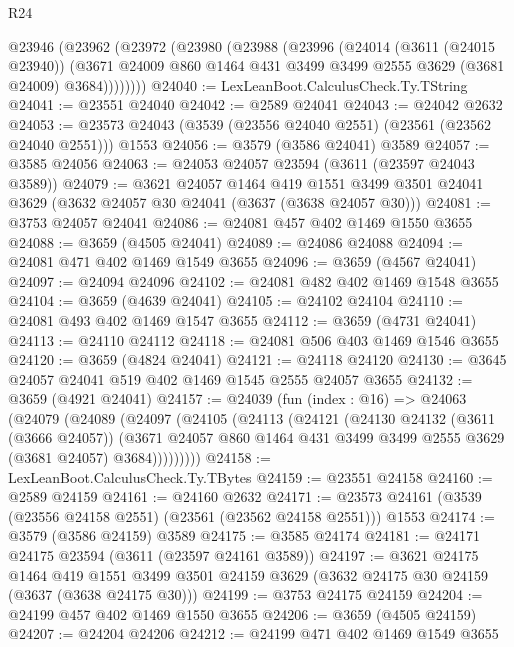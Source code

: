 \begin{lexlean}{R24}
\begin{coremodule}
    @23946
      (@23962
        (@23972
          (@23980
            (@23988
              (@23996
                (@24014
                  (@3611 (@24015 @23940))
                  (@3671 @24009 @860 @1464 @431 @3499 @3499 @2555 @3629 (@3681 @24009) @3684))))))))
@24040 := LexLeanBoot.CalculusCheck.Ty.TString
@24041 := @23551 @24040
@24042 := @2589 @24041
@24043 := @24042 @2632
@24053 := @23573 @24043 (@3539 (@23556 @24040 @2551) (@23561 (@23562 @24040 @2551))) @1553
@24056 := @3579 (@3586 @24041) @3589
@24057 := @3585 @24056
@24063 := @24053 @24057 @23594 (@3611 (@23597 @24043 @3589))
@24079 := @3621
    @24057
    @1464
    @419
    @1551
    @3499
    @3501
    @24041
    @3629
    (@3632 @24057 @30 @24041 (@3637 (@3638 @24057 @30)))
@24081 := @3753 @24057 @24041
@24086 := @24081 @457 @402 @1469 @1550 @3655
@24088 := @3659 (@4505 @24041)
@24089 := @24086 @24088
@24094 := @24081 @471 @402 @1469 @1549 @3655
@24096 := @3659 (@4567 @24041)
@24097 := @24094 @24096
@24102 := @24081 @482 @402 @1469 @1548 @3655
@24104 := @3659 (@4639 @24041)
@24105 := @24102 @24104
@24110 := @24081 @493 @402 @1469 @1547 @3655
@24112 := @3659 (@4731 @24041)
@24113 := @24110 @24112
@24118 := @24081 @506 @403 @1469 @1546 @3655
@24120 := @3659 (@4824 @24041)
@24121 := @24118 @24120
@24130 := @3645 @24057 @24041 @519 @402 @1469 @1545 @2555 @24057 @3655
@24132 := @3659 (@4921 @24041)
@24157 := @24039
    (fun (index : @16) =>
    @24063
      (@24079
        (@24089
          (@24097
            (@24105
              (@24113
                (@24121
                  (@24130
                    @24132
                    (@3611 (@3666 @24057))
                    (@3671
                      @24057
                      @860
                      @1464
                      @431
                      @3499
                      @3499
                      @2555
                      @3629
                      (@3681 @24057)
                      @3684)))))))))
@24158 := LexLeanBoot.CalculusCheck.Ty.TBytes
@24159 := @23551 @24158
@24160 := @2589 @24159
@24161 := @24160 @2632
@24171 := @23573 @24161 (@3539 (@23556 @24158 @2551) (@23561 (@23562 @24158 @2551))) @1553
@24174 := @3579 (@3586 @24159) @3589
@24175 := @3585 @24174
@24181 := @24171 @24175 @23594 (@3611 (@23597 @24161 @3589))
@24197 := @3621
    @24175
    @1464
    @419
    @1551
    @3499
    @3501
    @24159
    @3629
    (@3632 @24175 @30 @24159 (@3637 (@3638 @24175 @30)))
@24199 := @3753 @24175 @24159
@24204 := @24199 @457 @402 @1469 @1550 @3655
@24206 := @3659 (@4505 @24159)
@24207 := @24204 @24206
@24212 := @24199 @471 @402 @1469 @1549 @3655

\end{coremodule}
\end{lexlean}
